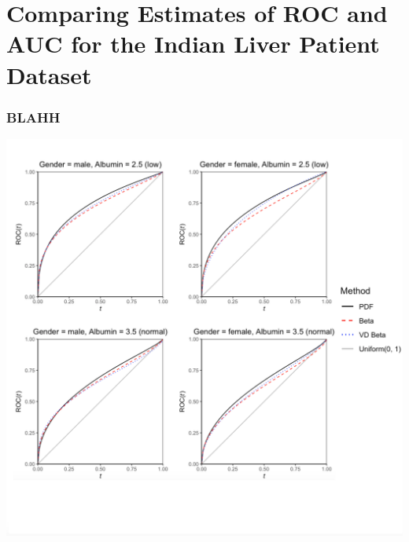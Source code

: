 \documentclass[t]{beamer}
\begin{document}
\section{Comparing Estimates of ROC and AUC for the Indian Liver Patient Dataset}

\begin{frame}
	\frametitle{BLAHH}
	\begin{center}
		\includegraphics[scale=0.36]{tryin2}
	\end{center}
\end{frame}
\end{document}
